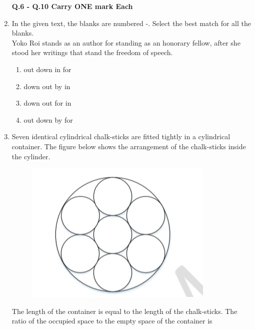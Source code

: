 \documentclass[journal,12pt,onecolumn]{article}
\theoremstyle{remark}
\begin{document}
\begin{enumerate}
    \textbf{Q.6 - Q.10 Carry ONE mark Each}
    \item In the given text, the blanks are numbered -. Select the best match for
    all the blanks.\\
    Yoko Roi stands \underline{\hspace{1cm}}  as an author for standing \underline{\hspace{1cm}}  as an honorary
    fellow, after she stood \underline{\hspace{1cm}}   her writings that stand \underline{\hspace{1cm}}  the freedom of
    speech.
    
    \hfill{}
    \begin{enumerate}
        \item {} out  down  in  for
        \item {} down  out  by  in
        \item {} down  out  for  in
        \item {} out  down  by  for
    \end{enumerate}

    \item Seven identical cylindrical chalk-sticks are fitted tightly in a cylindrical container.
    The figure  below shows the arrangement of the chalk-sticks inside the cylinder.
    \begin{figure}[H]
        \centering
        \includegraphics[width=0.7\columnwidth]{figs/2Q7.jpg}
        \caption{}
        \label{fig:q7}
    \end{figure}
    The length of the container is equal to the length of the chalk-sticks. The ratio of the occupied space to the empty space of the container is
    

\end{enumerate}
\end{document}
